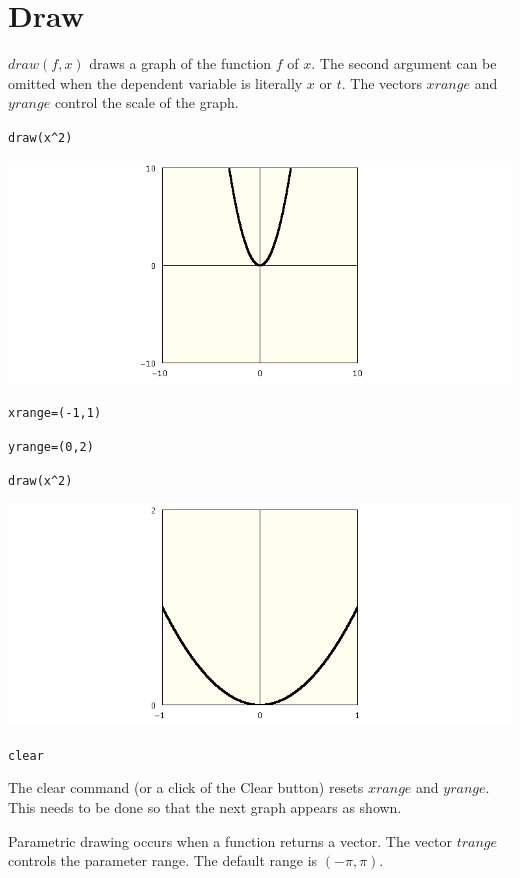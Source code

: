 \section*{Draw}
$draw(f,x)$ draws a graph of the function $f$ of $x$.
The second argument can be omitted when the dependent variable
is literally $x$ or $t$.
The vectors $xrange$ and $yrange$ control the scale of the graph.

\medskip
\verb$draw(x^2)$

\medskip
\begin{center}
\includegraphics[scale=0.4]{parabola.png}
\end{center}

\verb$xrange=(-1,1)$

\verb$yrange=(0,2)$

\verb$draw(x^2)$

\medskip
\begin{center}
\includegraphics[scale=0.4]{parabola2.png}
\end{center}

\verb$clear$

\medskip
\noindent
The clear command (or a click of the Clear button)
resets $xrange$ and $yrange$.
This needs to be done so that the next graph
appears as shown.

\newpage

\noindent
Parametric drawing occurs when a function returns a vector.
The vector $trange$ controls the parameter range.
The default range is $(-\pi,\pi)$.

